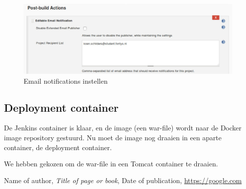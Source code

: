 \documentclass[12pt]{article}
\begin{document}
\begin{figure}[H]
	\begin{center}
		\includegraphics[width=1.0\textwidth]{images/Postbuildaction.PNG}
		\caption{Email notifications instellen\label{fig:jenkins_config_email_notifications}}
	\end{center}
\end{figure}


\subsection{Deployment container}
De Jenkins container is klaar, en de image (een war-file) wordt naar de Docker image repository gestuurd. Nu moet de image nog draaien in een aparte container, de deployment container.

We hebben gekozen om de war-file in een Tomcat container te draaien. 







\begin{thebibliography}{9}
		Name of author,
		\textit{Title of page or book},
		Date of publication,
		\url{https://google.com}
\end{thebibliography}
\end{document}
